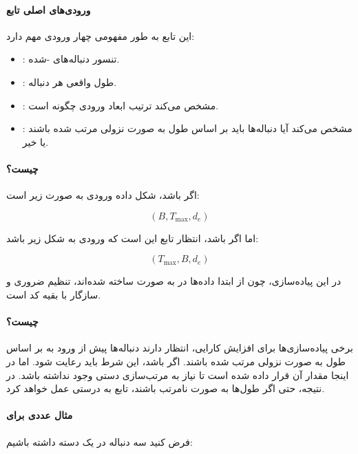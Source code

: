 \documentclass{article}
\begin{document}
\paragraph{ورودی‌های اصلی تابع}
این تابع به طور مفهومی چهار ورودی مهم دارد:

\begin{itemize}
	\item {}: تنسور دنباله‌های -شده.
	\item {}: طول واقعی هر دنباله.
	\item {}: مشخص می‌کند ترتیب ابعاد ورودی چگونه است.
	\item {}: مشخص می‌کند آیا دنباله‌ها باید بر اساس طول به صورت نزولی مرتب شده باشند یا خیر.
\end{itemize}

\paragraph{ چیست؟}
اگر  باشد، شکل داده ورودی به صورت زیر است:

\begin{equation}
	(B, T_{\max}, d_e)
\end{equation}

اما اگر  باشد، انتظار تابع این است که ورودی به شکل زیر باشد:

\begin{equation}
	(T_{\max}, B, d_e)
\end{equation}

در این پیاده‌سازی، چون از ابتدا داده‌ها در  به صورت  ساخته شده‌اند، تنظیم  ضروری و سازگار با بقیه کد است.

\paragraph{ چیست؟}
برخی پیاده‌سازی‌ها برای افزایش کارایی، انتظار دارند دنباله‌ها پیش از ورود به  بر اساس طول به صورت نزولی مرتب شده باشند. اگر  باشد، این شرط باید رعایت شود. اما در اینجا مقدار آن  قرار داده شده است تا نیاز به مرتب‌سازی دستی وجود نداشته باشد. در نتیجه، حتی اگر طول‌ها به صورت نامرتب باشند، تابع به درستی عمل خواهد کرد.

\paragraph{مثال عددی برای }
فرض کنید سه دنباله در یک دسته داشته باشیم:
\end{document}
